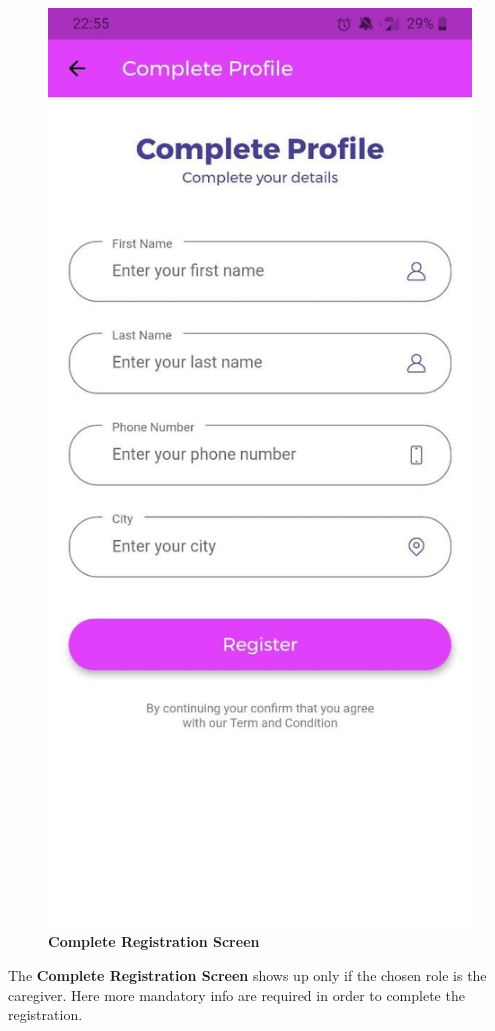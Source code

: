 \documentclass[../../dd.tex]{subfiles}
\begin{document}
    \begin{figure}[H]
        \centering
        \includegraphics[height=.6\textheight]{../../assets/screens/complete.jpg}
        \caption{\textbf{Complete Registration Screen}}\label{fig:figure}
    \end{figure}
    \begin{center}
        The \textbf{Complete Registration Screen} shows up only if the chosen role is the caregiver.
        Here more mandatory info are required in order to complete the registration.
    \end{center}
\end{document}
